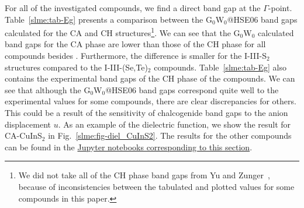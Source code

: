 \begin{refsection}
 
For all of the investigated compounds, we find a direct band gap at the 
$\Gamma$-point. Table~\ref{slme:tab-Eg} presents a comparison between the 
G$_0$W$_0$@HSE06 band gaps calculated for the CA and CH 
structures\footnote[4]{We did not take all of the CH phase band gaps from Yu 
and Zunger~\cite{Yu2012}, because of inconsistencies between the tabulated and 
plotted values for some compounds in this paper.}. We can see that the 
G$_0$W$_0$ calculated band gaps for the CA phase are lower than those of the 
CH phase for all compounds besides . Furthermore, the difference is 
smaller for the \mbox{I-III-S$_2$} structures compared to the 
\mbox{I-III-(Se,Te)$_2$} compounds. Table~\ref{slme:tab-Eg} also contains the 
experimental band gaps of the CH phase of the compounds. We can see that 
although the G$_0$W$_0$@HSE06 band gaps correspond quite well to the 
experimental values for some compounds, there are clear discrepancies for 
others. This could be a result of the sensitivity of chalcogenide band gaps to 
the anion displacement $u$. As an example of the dielectric function, we show 
the result for \mbox{CA-CuInS$_2$} in Fig.~\ref{slme:fig-diel_CuInS2}. The 
results for the other compounds can be found in the \href{https://github.com/mbercx/phd-thesis/tree/master/jupyter/slme}{Jupyter notebooks corresponding to this section}. 
 

\end{refsection}
